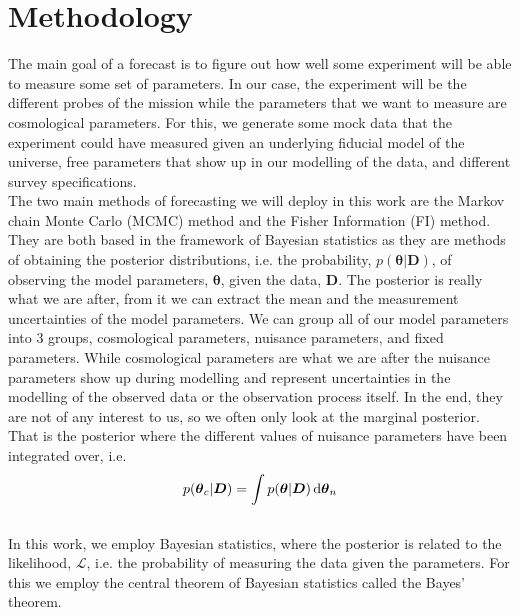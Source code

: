 \documentclass[../main.tex]{subfiles}
\begin{document}
\chapter{Methodology}
The main goal of a forecast is to figure out how well some experiment will be able to measure some set of parameters. In our case, the experiment will be the different probes of the \Euclid mission while the parameters that we want to measure are cosmological parameters. For this, we generate some mock data that the experiment could have measured given an underlying fiducial model of the universe, free parameters that show up in our modelling of the data, and different survey specifications.\\
The two main methods of forecasting we will deploy in this work are the Markov chain Monte Carlo (MCMC) method and the Fisher Information (FI) method. They are both based in the framework of Bayesian statistics as they are methods of obtaining the posterior distributions, i.e. the probability, $p(\boldsymbol{\theta}|\boldsymbol{D})$, of observing the model parameters, $\boldsymbol{\theta}$, given the data, $\boldsymbol{D}$. The posterior is really what we are after, from it we can extract the mean and the measurement uncertainties of the model parameters. We can group all of our model parameters into 3 groups, cosmological parameters, nuisance parameters, and fixed parameters. While cosmological parameters are what we are after the nuisance parameters show up during modelling and represent uncertainties in the modelling of the observed data or the observation process itself. In the end, they are not of any interest to us, so we often only look at the marginal posterior. That is the posterior where the different values of nuisance parameters have been integrated over, i.e. \begin{equation}
    \label{eq:bayes-theorem}
    p(\boldsymbol{\theta}_c|\boldsymbol{D}) = \int p(\boldsymbol{\theta}|\boldsymbol{D})\,\mathrm{d} \boldsymbol{\theta}_n
\end{equation}\\
In this work, we employ Bayesian statistics, where the posterior is related to the likelihood, $\mathcal{L}$, i.e. the probability of measuring the data given the parameters. For this we employ the central theorem of Bayesian statistics called the Bayes' theorem.
\end{document}
